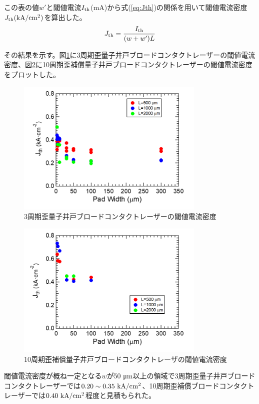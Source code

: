 この表の値$w'$と閾値電流$I_{\rm{th}}$(mA)から式(\ref{eq:Jth})の関係を用いて閾値電流密度$J_{\rm{th}} \rm{(kA/cm^2)}$を算出した。
\begin{eqnarray}
J_{\rm{th}}=\dfrac{I_{\rm{th}}}{(w+w')L}
\label{eq:Jth}
\end{eqnarray}

その結果を示す。図\ref{fig:fig_3_1_3QW_broadcontact_Jth}に3周期歪量子井戸ブロードコンタクトレーザーの閾値電流密度、図\ref{fig:fig_3_1_10QW_broadcontact_Jth}に10周期歪補償量子井戸ブロードコンタクトレーザーの閾値電流密度をプロットした。

\begin{figure}[h]
	\centering
	\includegraphics[width=9cm]{figure/fig_3_1_3QW_broadcontact_Jth.png}
		\caption{3周期歪量子井戸ブロードコンタクトレーザーの閾値電流密度}
		\label{fig:fig_3_1_3QW_broadcontact_Jth}
\end{figure}

\begin{figure}[ht]
	\centering
	\includegraphics[width=9cm]{figure/fig_3_1_10QW_broadcontact_Jth.png}
		\caption{10周期歪補償量子井戸ブロードコンタクトレーザの閾値電流密度}
		\label{fig:fig_3_1_10QW_broadcontact_Jth}
\end{figure}
閾値電流密度が概ね一定となる$w$が50 \si{\micro\metre}以上の領域で3周期歪量子井戸ブロードコンタクトレーザーでは$0.20\sim 0.35\ \si{ \rm{  kA/cm^{2}}}$、10周期歪補償ブロードコンタクトレーザーでは$0.40\ \rm{  kA/cm^{2}}$程度と見積もられた。

